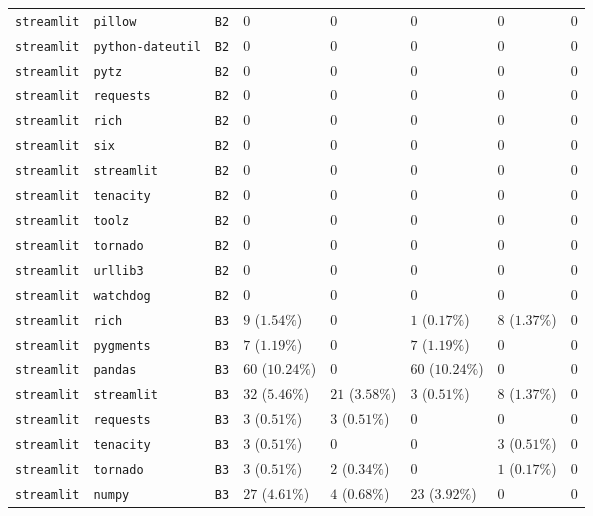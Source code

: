 \begin{table}
\begin{tabular}{llllllll}
\texttt{streamlit} & \texttt{pillow} & \texttt{B2} & $0$ & $0$ & $0$ & $0$ & $0$ \\
\texttt{streamlit} & \texttt{python-dateutil} & \texttt{B2} & $0$ & $0$ & $0$ & $0$ & $0$ \\
\texttt{streamlit} & \texttt{pytz} & \texttt{B2} & $0$ & $0$ & $0$ & $0$ & $0$ \\
\texttt{streamlit} & \texttt{requests} & \texttt{B2} & $0$ & $0$ & $0$ & $0$ & $0$ \\
\texttt{streamlit} & \texttt{rich} & \texttt{B2} & $0$ & $0$ & $0$ & $0$ & $0$ \\
\texttt{streamlit} & \texttt{six} & \texttt{B2} & $0$ & $0$ & $0$ & $0$ & $0$ \\
\texttt{streamlit} & \texttt{streamlit} & \texttt{B2} & $0$ & $0$ & $0$ & $0$ & $0$ \\
\texttt{streamlit} & \texttt{tenacity} & \texttt{B2} & $0$ & $0$ & $0$ & $0$ & $0$ \\
\texttt{streamlit} & \texttt{toolz} & \texttt{B2} & $0$ & $0$ & $0$ & $0$ & $0$ \\
\texttt{streamlit} & \texttt{tornado} & \texttt{B2} & $0$ & $0$ & $0$ & $0$ & $0$ \\
\texttt{streamlit} & \texttt{urllib3} & \texttt{B2} & $0$ & $0$ & $0$ & $0$ & $0$ \\
\texttt{streamlit} & \texttt{watchdog} & \texttt{B2} & $0$ & $0$ & $0$ & $0$ & $0$ \\
\texttt{streamlit} & \texttt{rich} & \texttt{B3} & $9$ ($1.54\%$) & $0$ & $1$ ($0.17\%$) & $8$ ($1.37\%$) & $0$ \\
\texttt{streamlit} & \texttt{pygments} & \texttt{B3} & $7$ ($1.19\%$) & $0$ & $7$ ($1.19\%$) & $0$ & $0$ \\
\texttt{streamlit} & \texttt{pandas} & \texttt{B3} & $60$ ($10.24\%$) & $0$ & $60$ ($10.24\%$) & $0$ & $0$ \\
\texttt{streamlit} & \texttt{streamlit} & \texttt{B3} & $32$ ($5.46\%$) & $21$ ($3.58\%$) & $3$ ($0.51\%$) & $8$ ($1.37\%$) & $0$ \\
\texttt{streamlit} & \texttt{requests} & \texttt{B3} & $3$ ($0.51\%$) & $3$ ($0.51\%$) & $0$ & $0$ & $0$ \\
\texttt{streamlit} & \texttt{tenacity} & \texttt{B3} & $3$ ($0.51\%$) & $0$ & $0$ & $3$ ($0.51\%$) & $0$ \\
\texttt{streamlit} & \texttt{tornado} & \texttt{B3} & $3$ ($0.51\%$) & $2$ ($0.34\%$) & $0$ & $1$ ($0.17\%$) & $0$ \\
\texttt{streamlit} & \texttt{numpy} & \texttt{B3} & $27$ ($4.61\%$) & $4$ ($0.68\%$) & $23$ ($3.92\%$) & $0$ & $0$ \\

\end{tabular}
\end{table}

